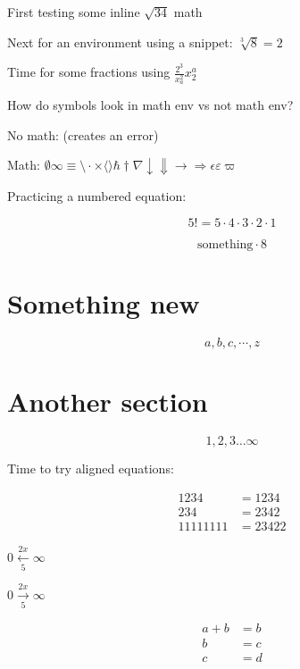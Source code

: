 \documentclass{article}
\begin{document}

First testing some inline $\sqrt{34}$ math 

Next for an environment using a snippet: $\sqrt[3]{8}=2$

Time for some fractions using $\frac{2^3}{x_a^2}x^a_2$  

How do symbols look in math env vs not math env?

No math: (creates an error)

Math: $\emptyset \infty \equiv \setminus \cdot \times \langle \rangle \hbar \dagger \nabla \downarrow \Downarrow \rightarrow \Rightarrow \epsilon \varepsilon \varpi$

Practicing a numbered equation:

\begin{equation}
5! = 5 \cdot 4 \cdot 3 \cdot 2 \cdot 1
\label{eq:first}
\end{equation}

\begin{equation*}
\text{something} \cdot 8
\end{equation*}

\section{Something new}

\begin{equation}
a, b, c, \cdots, z
\end{equation}

\section{Another section}

\begin{equation}
1, 2, 3 \dotsc  \infty
\end{equation}

Time to try aligned equations:

\begin{align*}
    1234 &= 1234 \\
    234 &= 2342 \\
    11111111 &= 23422
\end{align*}

$0\xleftarrow[5]{2x}\infty$

$0\xrightarrow[5]{2x}\infty$


\begin{equation}
\begin{split}
    a + b &= b \\
    b &= c \\
    c &= d
\end{split}
\end{equation}
\end{document}
